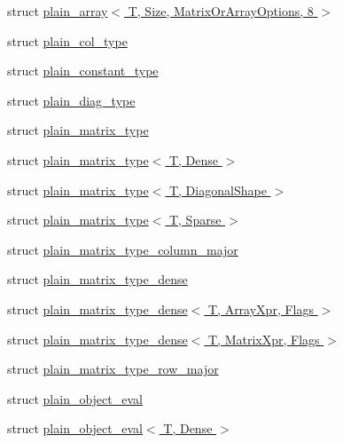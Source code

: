 \begin{DoxyCompactItemize}
\item 
struct \hyperlink{struct_eigen_1_1internal_1_1plain__array_3_01_t_00_01_size_00_01_matrix_or_array_options_00_018_01_4}{plain\+\_\+array$<$ T, Size, Matrix\+Or\+Array\+Options, 8 $>$}
\item 
struct \hyperlink{struct_eigen_1_1internal_1_1plain__col__type}{plain\+\_\+col\+\_\+type}
\item 
struct \hyperlink{struct_eigen_1_1internal_1_1plain__constant__type}{plain\+\_\+constant\+\_\+type}
\item 
struct \hyperlink{struct_eigen_1_1internal_1_1plain__diag__type}{plain\+\_\+diag\+\_\+type}
\item 
struct \hyperlink{struct_eigen_1_1internal_1_1plain__matrix__type}{plain\+\_\+matrix\+\_\+type}
\item 
struct \hyperlink{struct_eigen_1_1internal_1_1plain__matrix__type_3_01_t_00_01_dense_01_4}{plain\+\_\+matrix\+\_\+type$<$ T, Dense $>$}
\item 
struct \hyperlink{struct_eigen_1_1internal_1_1plain__matrix__type_3_01_t_00_01_diagonal_shape_01_4}{plain\+\_\+matrix\+\_\+type$<$ T, Diagonal\+Shape $>$}
\item 
struct \hyperlink{struct_eigen_1_1internal_1_1plain__matrix__type_3_01_t_00_01_sparse_01_4}{plain\+\_\+matrix\+\_\+type$<$ T, Sparse $>$}
\item 
struct \hyperlink{struct_eigen_1_1internal_1_1plain__matrix__type__column__major}{plain\+\_\+matrix\+\_\+type\+\_\+column\+\_\+major}
\item 
struct \hyperlink{struct_eigen_1_1internal_1_1plain__matrix__type__dense}{plain\+\_\+matrix\+\_\+type\+\_\+dense}
\item 
struct \hyperlink{struct_eigen_1_1internal_1_1plain__matrix__type__dense_3_01_t_00_01_array_xpr_00_01_flags_01_4}{plain\+\_\+matrix\+\_\+type\+\_\+dense$<$ T, Array\+Xpr, Flags $>$}
\item 
struct \hyperlink{struct_eigen_1_1internal_1_1plain__matrix__type__dense_3_01_t_00_01_matrix_xpr_00_01_flags_01_4}{plain\+\_\+matrix\+\_\+type\+\_\+dense$<$ T, Matrix\+Xpr, Flags $>$}
\item 
struct \hyperlink{struct_eigen_1_1internal_1_1plain__matrix__type__row__major}{plain\+\_\+matrix\+\_\+type\+\_\+row\+\_\+major}
\item 
struct \hyperlink{struct_eigen_1_1internal_1_1plain__object__eval}{plain\+\_\+object\+\_\+eval}
\item 
struct \hyperlink{struct_eigen_1_1internal_1_1plain__object__eval_3_01_t_00_01_dense_01_4}{plain\+\_\+object\+\_\+eval$<$ T, Dense $>$}

\end{DoxyCompactItemize}
